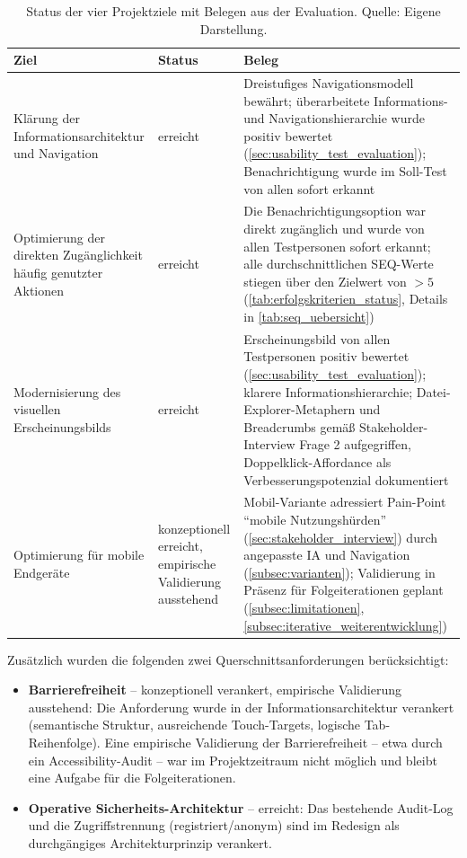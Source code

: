 \begin{table}[H]
    \centering
    \scriptsize
    \begin{tabular}{@{}p{4.5cm}p{3.5cm}p{6.5cm}@{}}
        \toprule
        \textbf{Ziel} & \textbf{Status} & \textbf{Beleg} \\
        \midrule
        Klärung der Informationsarchitektur und Navigation & erreicht & Dreistufiges Navigationsmodell bewährt; überarbeitete Informations- und Navigationshierarchie wurde positiv bewertet (\autoref{sec:usability_test_evaluation}); Benachrichtigung wurde im Soll-Test von allen sofort erkannt \\
        \addlinespace
        Optimierung der direkten Zugänglichkeit häufig genutzter Aktionen & erreicht & Die Benachrichtigungsoption war direkt zugänglich und wurde von allen Testpersonen sofort erkannt; alle durchschnittlichen SEQ-Werte stiegen über den Zielwert von $> 5$ (\autoref{tab:erfolgskriterien_status}, Details in \autoref{tab:seq_uebersicht}) \\
        \addlinespace
        Modernisierung des visuellen Erscheinungsbilds & erreicht & Erscheinungsbild von allen Testpersonen positiv bewertet (\autoref{sec:usability_test_evaluation}); klarere Informationshierarchie; Datei-Explorer-Metaphern und Breadcrumbs gemäß Stakeholder-Interview Frage 2 aufgegriffen, Doppelklick-Affordance als Verbesserungspotenzial dokumentiert \\
        \addlinespace
        Optimierung für mobile Endgeräte & konzeptionell erreicht, empirische Validierung ausstehend & Mobil-Variante adressiert Pain-Point \enquote{mobile Nutzungshürden} (\autoref{sec:stakeholder_interview}) durch angepasste IA und Navigation (\autoref{subsec:varianten}); Validierung in Präsenz für Folgeiterationen geplant (\autoref{subsec:limitationen}, \autoref{subsec:iterative_weiterentwicklung}) \\
        \bottomrule
    \end{tabular}
    \caption[Status der vier Projektziele]{Status der vier Projektziele mit Belegen aus der Evaluation. Quelle: Eigene Darstellung.}
    \label{tab:ziel_status}
\end{table}

Zusätzlich wurden die folgenden zwei Querschnittsanforderungen berücksichtigt:

\begin{itemize}
  \item[Q1] \textbf{Barrierefreiheit} -- konzeptionell verankert, empirische Validierung ausstehend: Die Anforderung wurde in der Informationsarchitektur verankert (semantische Struktur, ausreichende Touch-Targets, logische Tab-Reihenfolge). Eine empirische Validierung der Barrierefreiheit -- etwa durch ein Accessibility-Audit -- war im Projektzeitraum nicht möglich und bleibt eine Aufgabe für die Folgeiterationen.
  \item[Q2] \textbf{Operative Sicherheits-Architektur} -- erreicht: Das bestehende Audit-Log und die Zugriffstrennung (registriert/anonym) sind im Redesign als durchgängiges Architekturprinzip verankert.
\end{itemize}

